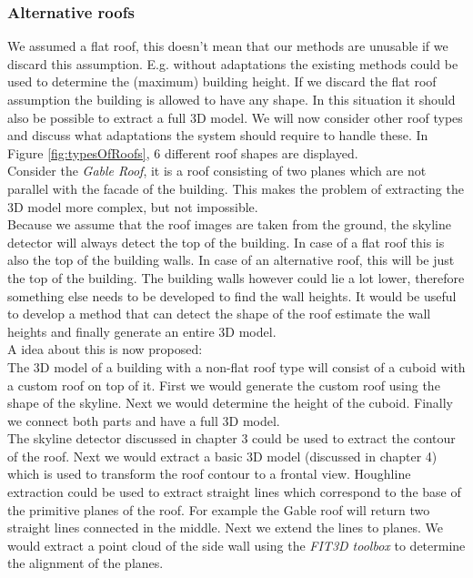 \subsubsection{Alternative roofs}
We assumed a flat roof, this doesn't mean that our methods are unusable if
we discard this assumption.
E.g. without adaptations the existing methods could be used to determine the (maximum)
building height. 
If we discard the flat roof assumption the building is allowed to have any
shape. In this situation it should also be possible to extract a
full 3D model.  We will now consider other roof types and discuss what
adaptations the system should require to handle these.  In Figure
\ref{fig:typesOfRoofs}, 6 different roof shapes are displayed.\\

Consider the \emph{Gable Roof}, it is a roof consisting of two planes
which are not parallel with the facade of the building. This makes the problem
of extracting the 3D model more complex, but not impossible. \\
Because we assume that the roof images are taken from the ground, the skyline
detector will always detect the top of the building. In case of a flat roof
this is also the top of the building walls. In case of an
alternative roof, this will be just the top of the building. The building walls however
could lie a lot lower, therefore something else needs to be developed to find the wall
heights. It would be useful to develop a method that can detect the shape of the roof 
estimate the wall heights and finally generate an entire 3D model.\\
A idea about this is now proposed:\\

The 3D model of a building with a non-flat roof type will consist of a cuboid 
with a custom roof on top of it.  First we would generate the custom roof 
using the shape of the skyline.  Next we would determine the height of the
cuboid. Finally we connect both parts and have a full 3D model.\\

The skyline detector discussed in chapter 3 could be used to extract the contour
of the roof. Next we would extract a basic 3D model (discussed in chapter 4) which
is used to transform the roof contour to a frontal view.  Houghline
extraction could be used to extract straight lines which correspond to the base of
the primitive planes of the roof.  For example the Gable roof will return two
straight lines connected in the middle. Next we extend the lines to planes.
We would extract a point cloud of the side wall using the \emph{FIT3D toolbox\cite{FIT3D}} 
to determine the alignment of the planes.\\

